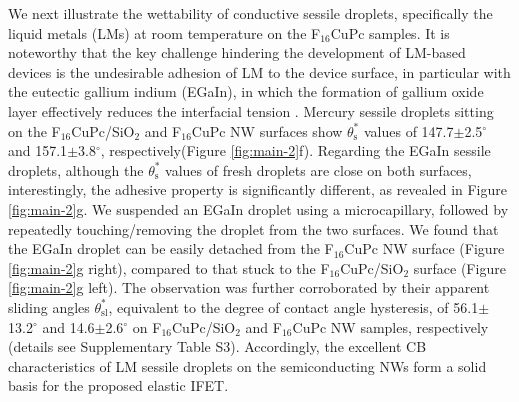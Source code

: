 We next illustrate the wettability of conductive sessile droplets,
specifically the liquid metals (LMs) at room temperature on the
F\(_{\text{16}}\)CuPc samples. It is noteworthy that the key challenge hindering
the development of LM-based devices is the undesirable adhesion of LM
to the device surface, in particular with the eutectic gallium indium
(EGaIn), in which the formation of gallium oxide layer effectively
reduces the interfacial tension
\cite{Dickey_2008,Doudrick_2014_oxide}. Mercury sessile droplets
sitting on the F\(_{\text{16}}\)CuPc/SiO\(_{\text{2}}\) and F\(_{\text{16}}\)CuPc NW surfaces show
\(\theta_{\mathrm{s}}^{*}\) values of 147.7\(\pm\)2.5\(^{\circ}\) and
157.1\(\pm\)3.8\(^{\circ}\), respectively(Figure \ref{fig:main-2}f).
Regarding the EGaIn sessile droplets, although the
\(\theta_{\mathrm{s}}^{*}\) values of fresh droplets are close on both
surfaces, interestingly, the adhesive property is significantly
different, as revealed in Figure \ref{fig:main-2}g. We suspended an
EGaIn droplet using a microcapillary, followed by repeatedly
touching/removing the droplet from the two surfaces. We found that
the EGaIn droplet can be easily detached from the F\(_{\text{16}}\)CuPc NW
surface (Figure \ref{fig:main-2}g right), compared to that stuck to the
F\(_{\text{16}}\)CuPc/SiO\(_{\text{2}}\) surface (Figure \ref{fig:main-2}g left). The observation was further corroborated
by their apparent sliding angles \(\theta_{\mathrm{sl}}^{*}\),
equivalent to the degree of contact angle hysteresis, of
56.1\(\pm\)13.2\(^{\circ}\) and 14.6\(\pm\)2.6\(^{\circ}\) on
F\(_{\text{16}}\)CuPc/SiO\(_{\text{2}}\) and F\(_{\text{16}}\)CuPc NW samples, respectively (details
see Supplementary Table S3). Accordingly, the excellent CB
characteristics of LM sessile droplets on the semiconducting NWs form
a solid basis for the proposed elastic IFET.

